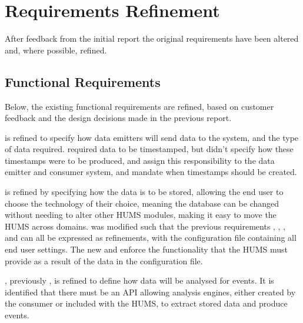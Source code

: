 \section{Requirements Refinement}
\label{sec:requirements}
After feedback from the initial report the original requirements have been 
altered and, where possible, refined.

\subsection{Functional Requirements}
\label{sec:requirements-functional}
Below, the existing functional requirements are refined, based on customer 
feedback and the design decisions made in the previous report.

 is refined to specify how data emitters will send data to the system, 
and the type of data required. 
 required data to be timestamped, but didn't specify how these 
timestamps were to be produced,  and  assign this
responsibility to the data emitter and consumer system, and mandate when 
timestamps should be created.

 is refined by specifying how the data is to be stored, allowing the end 
user to choose the technology of their choice, meaning the database can be 
changed without needing to alter other HUMS modules, making it easy to 
move the HUMS across domains.
 was modified such that the previous requirements , , 
, and  can all be expressed as refinements, with the 
configuration file containing all end user settings. The new  and  
enforce the  functionality that the HUMS must provide as a result of the data 
in the configuration file.

, previously , is refined to define how data will be analysed for 
events. It is identified that there must be an API allowing analysis engines, 
either created by the consumer or included with the HUMS, to extract stored 
data and produce events. 

